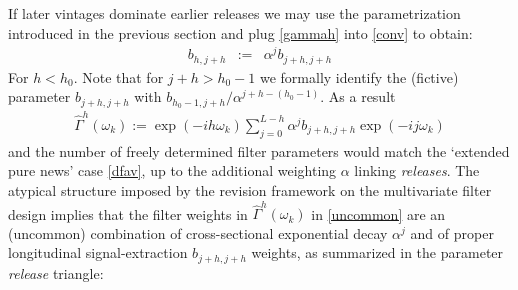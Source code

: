 \documentclass[11pt]{article}
\begin{document}
If later vintages dominate earlier releases we may use the parametrization introduced in the previous section and plug \ref{gammah} into \ref{conv} to obtain:
\begin{eqnarray}
b_{h,j+h}&:=&\alpha^jb_{j+h,j+h}\label{concv1}
\end{eqnarray}
For $h<h_0$. Note that for $j+h>h_0-1$ we formally identify the (fictive) parameter $b_{j+h,j+h}$ with $b_{h_0-1,j+h}/\alpha^{j+h-(h_0-1)}$. As a result
\begin{eqnarray}\label{uncommon}
\hat{\Gamma}^h(\omega_k):=\exp(-ih\omega_k)\sum_{j=0}^{L-h} \alpha^jb_{j+h,j+h}\exp(-ij\omega_k)
\end{eqnarray}
and the number of freely determined filter parameters would match the  `extended pure news' case \ref{dfav}, up to the additional weighting $\alpha$ linking \emph{releases}. The atypical structure imposed by the revision framework on the multivariate filter design implies that the filter weights in $\hat{\Gamma}^h(\omega_k)$ in \ref{uncommon} are an (uncommon) combination of cross-sectional exponential decay $\alpha^j$ and of proper longitudinal signal-extraction $b_{j+h,j+h}$ weights, as summarized in the parameter \emph{release} triangle:
\end{document}
